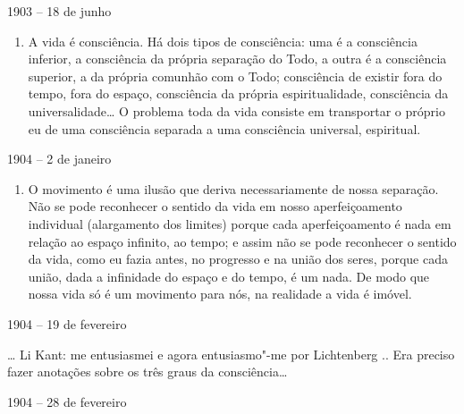 1903 -- 18 de junho

\begin{enumerate}
\def\labelenumi{\arabic{enumi})}
\setcounter{enumi}{3}
\item
  A vida é consciência. Há dois tipos de consciência: uma é a
  consciência inferior, a consciência da própria separação do Todo, a
  outra é a consciência superior, a da própria comunhão com o Todo;
  consciência de existir fora do tempo, fora do espaço, consciência da
  própria espiritualidade, consciência da universalidade\ldots{} O problema
  toda da vida consiste em transportar o próprio eu de uma consciência
  separada a uma consciência universal, espiritual.
\end{enumerate}

1904 -- 2 de janeiro

\begin{enumerate}
\def\labelenumi{\arabic{enumi})}
\setcounter{enumi}{4}
\item
  O movimento é uma ilusão que deriva necessariamente de nossa
  separação. Não se pode reconhecer o sentido da vida em nosso
  aperfeiçoamento individual (alargamento dos limites) porque cada
  aperfeiçoamento é nada em relação ao espaço infinito, ao tempo; e
  assim não se pode reconhecer o sentido da vida, como eu fazia antes,
  no progresso e na união dos seres, porque cada união, dada a
  infinidade do espaço e do tempo, é um nada. De modo que nossa vida só
  é um movimento para nós, na realidade a vida é imóvel.
\end{enumerate}

1904 -- 19 de fevereiro

\ldots{} Li Kant: me entusiasmei e agora entusiasmo"-me por Lichtenberg .. Era
preciso fazer anotações sobre os três graus da consciência\ldots{}

1904 -- 28 de fevereiro

